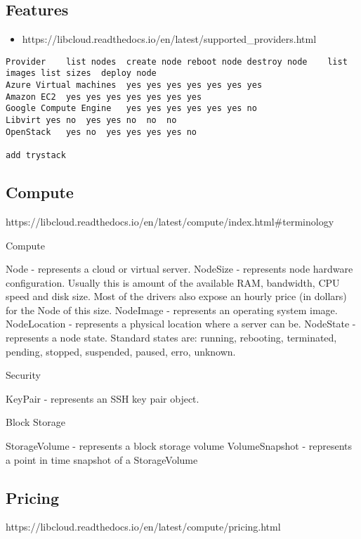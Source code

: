 \subsection{Features}

\begin{itemize}
\item
  https://libcloud.readthedocs.io/en/latest/supported\_providers.html
\end{itemize}

\begin{lstlisting}
Provider    list nodes  create node reboot node destroy node    list images list sizes  deploy node
Azure Virtual machines  yes yes yes yes yes yes yes
Amazon EC2  yes yes yes yes yes yes yes
Google Compute Engine   yes yes yes yes yes yes no
Libvirt yes no  yes yes no  no  no
OpenStack   yes no  yes yes yes yes no

add trystack
\end{lstlisting}

\subsection{Compute}

https://libcloud.readthedocs.io/en/latest/compute/index.html\#terminology

Compute

Node - represents a cloud or virtual server. NodeSize - represents node
hardware configuration. Usually this is amount of the available RAM,
bandwidth, CPU speed and disk size. Most of the drivers also expose an
hourly price (in dollars) for the Node of this size. NodeImage -
represents an operating system image. NodeLocation - represents a
physical location where a server can be. NodeState - represents a node
state. Standard states are: running, rebooting, terminated, pending,
stopped, suspended, paused, erro, unknown.

Security

KeyPair - represents an SSH key pair object.

Block Storage

StorageVolume - represents a block storage volume VolumeSnapshot -
represents a point in time snapshot of a StorageVolume

\subsection{Pricing}

https://libcloud.readthedocs.io/en/latest/compute/pricing.html

